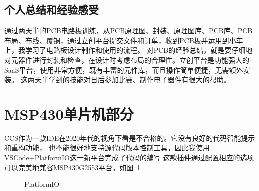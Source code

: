\documentclass[a4paper,twoside,zihao=5,UTF8]{ctexart}
\begin{document}
\begin{spacing}{1.2}
\subsection{个人总结和经验感受}

通过两天半的PCB电路板训练，从PCB原理图、封装、原理图库、PCB库、PCB布局、布线、覆铜，通过立创平台提交文件和订单，收到PCB板并运用到小车上，我学习了电路板设计制作和使用的流程。
对PCB的经验总结，就是要仔细地对元器件进行封装和检查，在设计时考虑布局的合理性。立创平台是功能强大的SaaS平台，使用非常方便，既有丰富的元件库，而且操作简单便捷，无需额外安装。
这两天半学到的技能对日后参加比赛、制作电子器件有很大的帮助。

\section{MSP430单片机部分}

CCS作为一款IDE在2020年代的视角下看是不合格的。它没有良好的代码智能提示和重构功能，
也不能很好地支持源代码版本控制工具，因此我使用VSCode+PlatformIO这一新平台完成了代码的编写
这款插件通过配置相应的选项可以完美地兼容MSP430G2553平台。如图~\ref{fig:platformio}

\begin{figure}[htb]
    \centering
	\caption{PlatformIO}
	\label{fig:platformio}
\end{figure}


\end{spacing}
\end{document}
